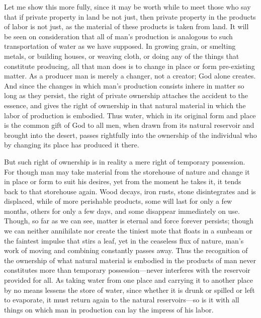 \documentclass{book}
\begin{document}
Let me show this more fully, since it may be worth while to meet those who say that if private property in land be not just, then private property in the products of labor is not just, as the material of these products is taken from land. It will be seen on consideration that all of man’s production is analogous to such transportation of water as we have supposed. In growing grain, or smelting metals, or building houses, or weaving cloth, or doing any of the things that constitute producing, all that man does is to change in place or form pre-existing matter. As a producer man is merely a changer, not a creator; God alone creates. And since the changes in which man’s production consists inhere in matter so long as they persist, the right of private ownership attaches the accident to the essence, and gives the right of ownership in that natural material in which the labor of production is embodied. Thus water, which in its original form and place is the common gift of God to all men, when drawn from its natural reservoir and brought into the desert, passes rightfully into the ownership of the individual who by changing its place has produced it there.

But such right of ownership is in reality a mere right of temporary possession. For though man may take material from the storehouse of nature and change it in place or form to suit his desires, yet from the moment he takes it, it tends back to that storehouse again. Wood decays, iron rusts, stone disintegrates and is displaced, while of more perishable products, some will last for only a few months, others for only a few days, and some disappear immediately on use. Though, so far as we can see, matter is eternal and force forever persists; though we can neither annihilate nor create the tiniest mote that floats in a sunbeam or the faintest impulse that stirs a leaf, yet in the ceaseless flux of nature, man’s work of moving and combining constantly passes away. Thus the recognition of the ownership of what natural material is embodied in the products of man never constitutes more than temporary possession—never interferes with the reservoir provided for all. As taking water from one place and carrying it to another place by no means lessens the store of water, since whether it is drunk or spilled or left to evaporate, it must return again to the natural reservoirs—so is it with all things on which man in production can lay the impress of his labor.
\end{document}
